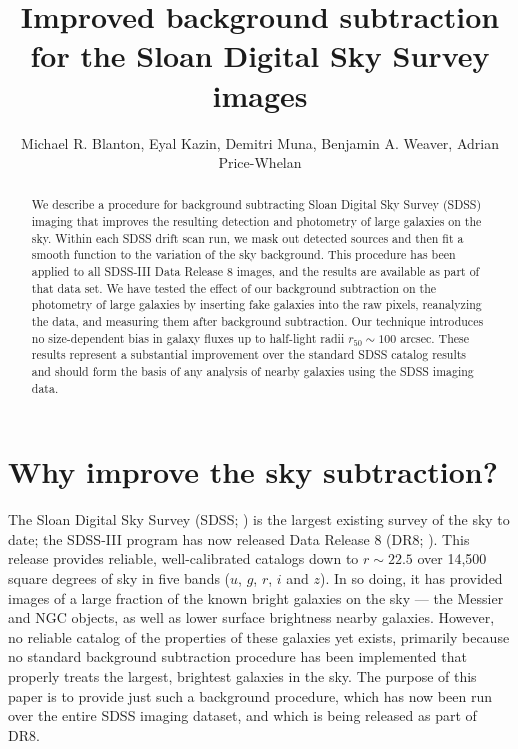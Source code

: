 \documentclass[10pt,preprint]{aastex}
\newcounter{address}
\begin{document}
\title{Improved background subtraction for the Sloan Digital Sky
  Survey images}


\author{
Michael R. Blanton\altaffilmark{\ref{NYU}},
Eyal Kazin\altaffilmark{\ref{NYU}},
Demitri Muna\altaffilmark{\ref{NYU}},
Benjamin A. Weaver\altaffilmark{\ref{NYU}},
Adrian Price-Whelan\altaffilmark{\ref{NYU}} 
}

\setcounter{address}{1}

\begin{abstract}
We describe a procedure for background subtracting Sloan Digital Sky
Survey (SDSS) imaging that improves the resulting detection and
photometry of large galaxies on the sky.  Within each SDSS drift scan
run, we mask out detected sources and then fit a smooth function to
the variation of the sky background.  This procedure has been applied
to all SDSS-III Data Release 8 images, and the results are available
as part of that data set.  We have tested the effect of our background
subtraction on the photometry of large galaxies by inserting fake
galaxies into the raw pixels, reanalyzing the data, and measuring them
after background subtraction.  Our technique introduces no
size-dependent bias in galaxy fluxes up to half-light radii $r_{50}
\sim 100$ arcsec. These results represent a substantial improvement
over the standard SDSS catalog results and should form the basis of
any analysis of nearby galaxies using the SDSS imaging data.
\end{abstract}

\section{Why improve the sky subtraction?}
\label{sec:intro}

The Sloan Digital Sky Survey (SDSS; \citealt{york00a}) is the largest
existing survey of the sky to date; the SDSS-III program has now
released Data Release 8 (DR8; \citealt{eisenstein11a, aihara11a}).
This release provides reliable, well-calibrated catalogs down to
$r\sim 22.5$ over 14,500 square degrees of sky in five bands ($u$,
$g$, $r$, $i$ and $z$).  In so doing, it has provided images of a
large fraction of the known bright galaxies on the sky --- the Messier
and NGC objects, as well as lower surface brightness nearby
galaxies. However, no reliable catalog of the properties of these
galaxies yet exists, primarily because no standard background
subtraction procedure has been implemented that properly treats the
largest, brightest galaxies in the sky. The purpose of this paper is
to provide just such a background procedure, which has now been run
over the entire SDSS imaging dataset, and which is being released as
part of DR8.
\end{document}
